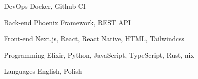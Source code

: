

\begin{cvskills}

  \cvskill
    {DevOps} %
    {Docker, Github CI} %

  \cvskill
    {Back-end} %
    {Phoenix Framework, REST API} %

  \cvskill
    {Front-end} %
    {Next.js, React, React Native, HTML, Tailwindcss} %

  \cvskill
    {Programming} %
    {Elixir, Python, JavaScript, TypeScript, Rust, nix} %

  \cvskill
    {Languages} %
    {English, Polish} %

\end{cvskills}
